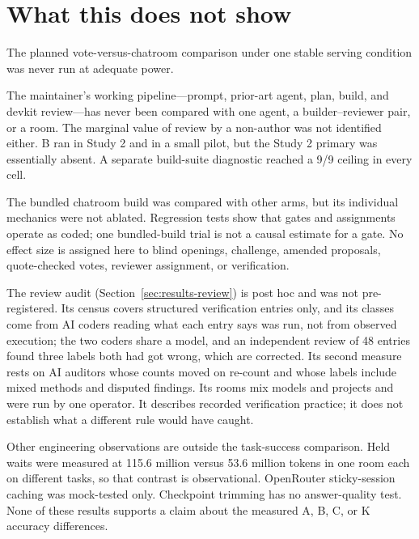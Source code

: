 \section{What this does not show}
\label{sec:limits}

The planned vote-versus-chatroom comparison under one stable serving condition was never run at adequate power.



The maintainer's working pipeline---prompt, prior-art agent, plan, build, and devkit review---has never been compared with one agent, a builder--reviewer pair, or a room. The marginal value of review by a non-author was not identified either. B ran in Study 2 and in a small pilot, but the Study 2 primary was essentially absent. A separate build-suite diagnostic reached a 9/9 ceiling in every cell.

The bundled chatroom build was compared with other arms, but its individual mechanics were not ablated. Regression tests show that gates and assignments operate as coded; one bundled-build trial is not a causal estimate for a gate. No effect size is assigned here to blind openings, challenge, amended proposals, quote-checked votes, reviewer assignment, or verification.

The review audit (Section~\ref{sec:results-review}) is post hoc and was not pre-registered. Its census covers structured verification entries only, and its classes come from AI coders reading what each entry says was run, not from observed execution; the two coders share a model, and an independent review of 48 entries found three labels both had got wrong, which are corrected. Its second measure rests on AI auditors whose counts moved on re-count and whose labels include mixed methods and disputed findings. Its rooms mix models and projects and were run by one operator. It describes recorded verification practice; it does not establish what a different rule would have caught.

Other engineering observations are outside the task-success comparison. Held waits were measured at 115.6 million versus 53.6 million tokens in one room each on different tasks, so that contrast is observational. OpenRouter sticky-session caching was mock-tested only. Checkpoint trimming has no answer-quality test. None of these results supports a claim about the measured A, B, C, or K accuracy differences.

